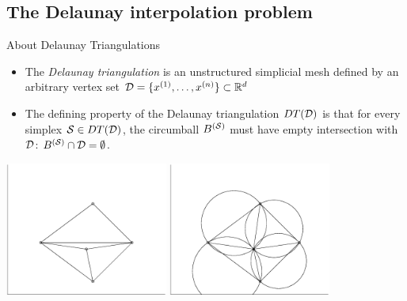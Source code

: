 \documentclass[xcolor=dvipsnames]{beamer}
\newcommand{\cmark}{\ding{51}}
\newcommand{\xmark}{\ding{55}}
\begin{document}
\subsection{The Delaunay interpolation problem}
\begin{frame}{About Delaunay Triangulations}
\begin{itemize}
\item The {\it Delaunay triangulation} is an unstructured simplicial mesh
defined by an arbitrary vertex set ${\cal D} = \{x^{(1)}, \ldots, x^{(n)}\} \subset \mathbb{R}^d$
\item The defining property of the Delaunay triangulation $DT({\cal D})$ is that
for every simplex ${\cal S} \in DT({\cal D})$, the circumball $B^{({\cal S})}$
must have empty intersection with ${\cal D}$:
$B^{({\cal S})} \cap {\cal D} = \emptyset$.
\end{itemize}
\begin{center}
\includegraphics[width=0.4\textwidth]{triangleplane.eps}
\hskip 4pt{\color{Red} \xmark}
\includegraphics[width=0.4\textwidth]{delaunayplane.eps}
\hskip 4pt{\color{Green} \cmark}
\end{center}
\end{frame}
\end{document}
